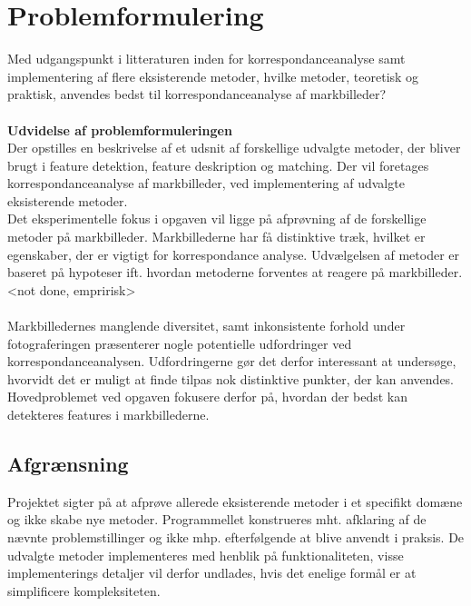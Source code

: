 \section{Problemformulering} \label{subsec:form}
Med udgangspunkt i litteraturen inden for
korrespondanceanalyse samt implementering af
flere eksisterende metoder, hvilke metoder, teoretisk
og praktisk, anvendes bedst til korrespondanceanalyse af markbilleder? \\ \\
\textbf{Udvidelse af problemformuleringen} \\
Der opstilles en beskrivelse af et udsnit af forskellige udvalgte metoder, der bliver brugt i feature detektion, feature deskription og matching. Der vil foretages korrespondanceanalyse af markbilleder, ved implementering af udvalgte eksisterende metoder. \\
Det eksperimentelle fokus i opgaven vil ligge på afprøvning af de forskellige metoder på markbilleder. Markbillederne har få distinktive træk, hvilket er egenskaber, der er vigtigt for korrespondance analyse. Udvælgelsen af metoder er baseret på hypoteser  ift. hvordan metoderne forventes at reagere på markbilleder. 
<not done, empririsk>
\\ \\
Markbilledernes manglende diversitet, samt inkonsistente forhold under fotograferingen præsenterer nogle potentielle udfordringer ved korrespondanceanalysen. Udfordringerne gør det derfor interessant at undersøge, hvorvidt det er muligt at finde tilpas nok distinktive punkter, der kan anvendes. Hovedproblemet ved opgaven fokusere derfor på, hvordan der bedst kan detekteres features i markbillederne.
\subsection{Afgrænsning} \label{subsec:afg}
Projektet sigter på at afprøve allerede eksisterende
metoder i et specifikt domæne og ikke
skabe nye metoder. Programmellet konstrueres mht. afklaring af de nævnte problemstillinger
og ikke mhp. efterfølgende at blive anvendt i praksis.
De udvalgte metoder implementeres med henblik på funktionaliteten, visse implementerings detaljer vil derfor undlades, hvis det enelige formål er at simplificere kompleksiteten.